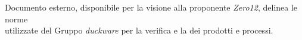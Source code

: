 Documento esterno, disponibile per la visione alla proponente \emph{Zero12}, delinea le norme\\ utilizzate del Gruppo \emph{duckware} per la verifica e la  dei prodotti e processi.